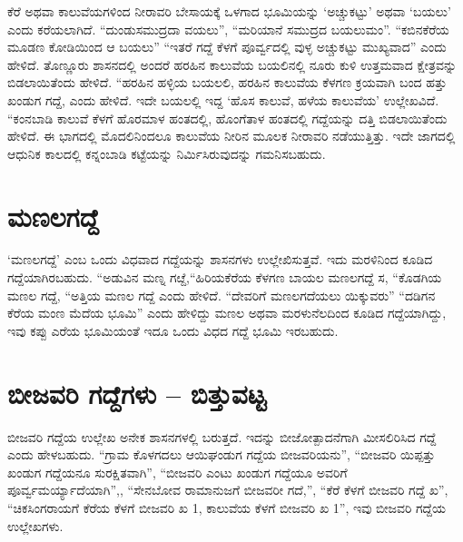 ಕೆರೆ ಅಥವಾ ಕಾಲುವೆಯಗಳಿಂದ ನೀರಾವರಿ ಬೇಸಾಯಕ್ಕೆ ಒಳಗಾದ ಭೂಮಿಯನ್ನು ‘ಅಚ್ಚುಕಟ್ಟು’ ಅಥವಾ ‘ಬಯಲು’ ಎಂದು ಕರೆಯಲಾಗಿದೆ. “ದುಂಡುಸಮುದ್ರದಾ ವಯಲು”, “ಮರಿಯಾನೆ ಸಮುದ್ರದ ಬಯಲುಮಂ”. “ಕಬಿನಕೆರೆಯ ಮೂಡಣ ಕೋಡಿಯಿಂದ ಆ ಬಯಲು” “ಇತರೆ ಗದ್ದೆ ಕೆಳಗೆ ಪೂರ್ವ್ವದಲ್ಲಿ ವುಳ್ಳ ಅಚ್ಚುಕಟ್ಟು ಮುಖ್ಯವಾದ” ಎಂದು ಹೇಳಿದೆ. ತೊಣ್ಣೂರು ಶಾಸನದಲ್ಲಿ ಅಂದರೆ ಹರಹಿನ ಕಾಲುವೆಯ ಬಯಲಿನಲ್ಲಿ ನೂರು ಕುಳಿ ಉತ್ತಮವಾದ ಕ್ಷೇತ್ರವನ್ನು ಬಿಡಲಾಯಿತೆಂದು ಹೇಳಿದೆ. “ಹರಹಿನ ಹಳ್ಳಿಯ ಬಯಲಲಿ, ಹರಹಿನ ಕಾಲುವೆಯ ಕೆಳಗಣ ಕ್ರಯವಾಗಿ ಬಂದ ಹತ್ತು ಖಂಡುಗ ಗದ್ದೆ, ಎಂದು ಹೇಳಿದೆ. ಇದೇ ಬಯಲಲ್ಲಿ ಇದ್ದ ‘ಹೊಸ ಕಾಲುವೆ, ಹಳೆಯ ಕಾಲುವೆಯ’ ಉಲ್ಲೇಖವಿದೆ. “ಕಂನಬಾಡಿ ಕಾಲುವೆ ಕೆಳಗೆ ಹೊರಮಾಳ ಹಂತದಲ್ಲಿ, ಹೊಂಗೆತಾಳ ಹಂತದಲ್ಲಿ ಗದ್ದೆಯನ್ನು ದತ್ತಿ ಬಿಡಲಾಯಿತೆಂದು ಹೇಳಿದೆ. ಈ ಭಾಗದಲ್ಲಿ ಮೊದಲಿನಿಂದಲೂ ಕಾಲುವೆಯ ನೀರಿನ ಮೂಲಕ ನೀರಾವರಿ ನಡೆಯುತ್ತಿತ್ತು. ಇದೇ ಜಾಗದಲ್ಲಿ ಆಧುನಿಕ ಕಾಲದಲ್ಲಿ ಕನ್ನಂಬಾಡಿ ಕಟ್ಟೆಯನ್ನು ನಿರ್ಮಿಸಿರುವುದನ್ನು ಗಮನಿಸಬಹುದು.


\section{ಮಣಲಗದ್ದೆ}

‘ಮಣಲಗದ್ದೆ’ ಎಂಬ ಒಂದು ವಿಧವಾದ ಗದ್ದೆಯನ್ನು ಶಾಸನಗಳು ಉಲ್ಲೇಖಿಸುತ್ತವೆ. ಇದು ಮರಳಿನಿಂದ ಕೂಡಿದ ಗದ್ದೆಯಾಗಿರಬಹುದು. “ಅಡುವಿನ ಮಣ್ನ ಗೞ್ದೆ,“ಹಿರಿಯಕೆರೆಯ ಕೆಳಗಣ ಬಾಯಲ ಮಣಲಗದ್ದೆ ಸ, “ಕೊಡಗಿಯ ಮಣಲ ಗದ್ದೆ, “ಅತ್ತಿಯ ಮಣಲ ಗದ್ದೆ ಎಂದು ಹೇಳಿದೆ. “ದೇವರಿಗೆ ಮಣಲಗದೆಯಲು ಯಿಕ್ಕುವರು” “ದಡಿಗನ ಕೆರೆಯ ಮಂಣ ಮೆದೆಯ ಭೂಮಿ” ಎಂದು ಹೇಳಿದ್ದು ಮಣಲ ಅಥವಾ ಮರಳುನೆಲದಿಂದ ಕೂಡಿದ ಗದ್ದೆಯಾಗಿದ್ದು, ಇವು ಕಪ್ಪು ಎರೆಯ ಭೂಮಿಯಂತೆ ಇದೂ ಒಂದು ವಿಧದ ಗದ್ದೆ ಭೂಮಿ ಇರಬಹುದು.


\section{ಬೀಜವರಿ ಗದ್ದೆಗಳು – ಬಿತ್ತುವಟ್ಟ}

ಬೀಜವರಿ ಗದ್ದೆಯ ಉಲ್ಲೇಖ ಅನೇಕ ಶಾಸನಗಳಲ್ಲಿ ಬರುತ್ತದೆ. ಇದನ್ನು ಬೀಜೋತ್ಪಾದನೆಗಾಗಿ ಮೀಸಲಿರಿಸಿದ ಗದ್ದೆ ಎಂದು ಹೇಳಬಹುದು. “ಗ್ರಾಮ ಕೊಳಗದಲು ಆಯಿಘಂಡುಗ ಗದ್ದೆಯ ಬೀಜವರಿಯನು”, “ಬೀಜವರಿ ಯಿಪ್ಪತ್ತು ಖಂಡುಗ ಗದ್ದೆಯನೂ ಸುರಕ್ಷಿತವಾಗಿ”, “ಬೀಜವರಿ ಎಂಟು ಖಂಡುಗ ಗದ್ದೆಯೂ ಅವರಿಗೆ ಪೂರ್ವ್ವಮರ್ಯ್ಯಾದೆಯಾಗಿ”,, “ಸೇನಬೋವ ರಾಮಾನುಜಗೆ ಬೀಜವರೀ ಗದೆ,”, “ಕೆರೆ ಕೆಳಗೆ ಬೀಜವರಿ ಗದ್ದೆ ಖ”, “ಚಿಕಸಿಂಗರಾಯಗೆ ಕೆರೆಯ ಕೆಳಗೆ ಬೀಜವರಿ ಖ 1, ಕಾಲುವೆಯ ಕೆಳಗೆ ಬೀಜವರಿ ಖ 1”, ಇವು ಬೀಜವರಿ ಗದ್ದೆಯ ಉಲ್ಲೇಖಗಳು.

